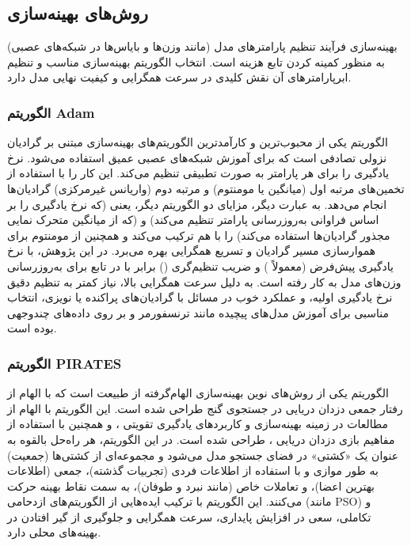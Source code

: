 \subsection{روش‌های بهینه‌سازی}
بهینه‌سازی فرآیند تنظیم پارامترهای مدل (مانند وزن‌ها و بایاس‌ها در شبکه‌های عصبی) به منظور کمینه کردن تابع هزینه  است. انتخاب الگوریتم بهینه‌سازی مناسب و تنظیم ابرپارامترهای  آن نقش کلیدی در سرعت همگرایی و کیفیت نهایی مدل دارد.

\subsubsection{الگوریتم Adam}
الگوریتم   یکی از محبوب‌ترین و کارآمدترین الگوریتم‌های بهینه‌سازی مبتنی بر گرادیان نزولی تصادفی  است که برای آموزش شبکه‌های عصبی عمیق استفاده می‌شود.  نرخ یادگیری  را برای هر پارامتر به صورت تطبیقی تنظیم می‌کند. این کار را با استفاده از تخمین‌های مرتبه اول (میانگین یا مومنتوم) و مرتبه دوم (واریانس غیرمرکزی) گرادیان‌ها انجام می‌دهد. به عبارت دیگر،  مزایای دو الگوریتم دیگر، یعنی  (که نرخ یادگیری را بر اساس فراوانی به‌روزرسانی پارامتر تنظیم می‌کند) و  (که از میانگین متحرک نمایی مجذور گرادیان‌ها استفاده می‌کند) را با هم ترکیب می‌کند و همچنین از مومنتوم برای هموارسازی مسیر گرادیان و تسریع همگرایی بهره می‌برد.
در این پژوهش،  با نرخ یادگیری پیش‌فرض (معمولاً ) و ضریب تنظیم‌گری  () برابر با  در تابع  برای به‌روزرسانی وزن‌های مدل  به کار رفته است.  به دلیل سرعت همگرایی بالا، نیاز کمتر به تنظیم دقیق نرخ یادگیری اولیه، و عملکرد خوب در مسائل با گرادیان‌های پراکنده یا نویزی، انتخاب مناسبی برای آموزش مدل‌های پیچیده مانند ترنسفورمر و  بر روی داده‌های چندوجهی بوده است.

\subsubsection{الگوریتم PIRATES}
الگوریتم  یکی از روش‌های نوین بهینه‌سازی الهام‌گرفته از طبیعت است که با الهام از رفتار جمعی دزدان دریایی در جستجوی گنج طراحی شده است. این الگوریتم با الهام از مطالعات \cite{Dunning2010} در زمینه بهینه‌سازی و کاربردهای یادگیری تقویتی \cite{LeQuy2023}، و همچنین با استفاده از مفاهیم بازی دزدان دریایی ، طراحی شده است. در این الگوریتم، هر راه‌حل بالقوه به عنوان یک «کشتی» در فضای جستجو مدل می‌شود و مجموعه‌ای از کشتی‌ها (جمعیت) به طور موازی و با استفاده از اطلاعات فردی (تجربیات گذشته)، جمعی (اطلاعات بهترین اعضا)، و تعاملات خاص (مانند نبرد و طوفان)، به سمت نقاط بهینه حرکت می‌کنند. این الگوریتم با ترکیب ایده‌هایی از الگوریتم‌های ازدحامی (مانند PSO) و تکاملی، سعی در افزایش پایداری، سرعت همگرایی و جلوگیری از گیر افتادن در بهینه‌های محلی دارد.

